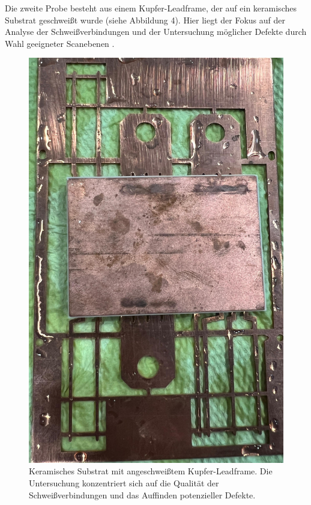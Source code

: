 Die zweite Probe besteht aus einem Kupfer-Leadframe, der auf ein keramisches Substrat geschweißt wurde (siehe Abbildung 4). Hier liegt der Fokus auf der Analyse der Schweißverbindungen und der Untersuchung möglicher Defekte durch Wahl geeigneter Scanebenen .
\begin{figure}[H]
    \centering
    \includegraphics[scale=0.12]{Bilder/probe 2}
    \caption{Keramisches Substrat mit angeschweißtem Kupfer-Leadframe. Die Untersuchung konzentriert sich auf die Qualität der Schweißverbindungen und das Auffinden potenzieller Defekte.}
    \vspace{0.2cm}
    \label{Abb.4: Keramisches Substrat mit angeschweißtem Kupfer-Leadframe. Die Untersuchung konzentriert sich auf die Qualität der Schweißverbindungen und das Auffinden potenzieller Defekte. }
\end{figure} 
\vspace{0.2cm}

